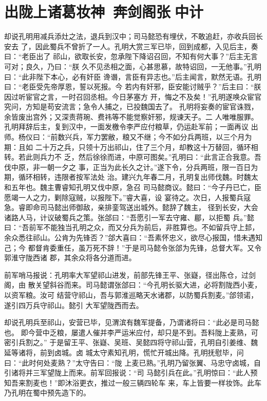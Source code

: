 \chapter{出陇上诸葛妆神~奔剑阁张中计}

却说孔明用减兵添灶之法，退兵到汉中；司马懿恐有埋伏，不敢追赶，亦收兵回长安去
了，因此蜀兵不曾折了一人。孔明大赏三军已毕，回到成都，入见后主，奏曰：“老臣出了
祁山，欲取长安，忽承陛下降诏召回，不知有何大事？”后主无言可对；良久，乃曰：“朕
久不见丞相之面，心甚思慕，故特诏回，一无他事。”孔明曰：“此非陛下本心，必有奸臣
谗谮，言臣有异志也。”后主闻言，默然无语。孔明曰：“老臣受先帝厚恩，誓以死报。今
若内有奸邪，臣安能讨贼乎？”后主曰：“朕因过听宦官之言，一时召回丞相。今日茅塞方
开，悔之不及矣！”孔明遂唤众宦官究问，方知是苟安流言；急令人捕之，已投魏国去了。
孔明将妄奏的宦官诛戮，余皆废出宫外；又深责蒋琬、费祎等不能觉察奸邪，规谏天子。二
人唯唯服罪。孔明拜辞后主，复到汉中，一面发檄令李严应付粮草，仍运赴军前；一面再议
出师。杨仪曰：“前数兴兵，军力罢敝，粮又不继；今不如分兵两班，以三个月为期：且如
二十万之兵，只领十万出祁山，住了三个月，却教这十万替回，循环相转。若此则兵力不
乏，然后徐徐而进，中原可图矣。”孔明曰：“此言正合我意。吾伐中原，非一朝一夕之
事，正当为此长久之计。”遂下令，分兵两班，限一百日为期，循环相转，违限者按军法处
治。建兴九年春二月，孔明复出师伐魏。时魏太和五年也。魏主曹睿知孔明又伐中原，急召
司马懿商议。懿曰：“今子丹已亡，臣愿竭一人之力，剿除寇贼，以报陛下。”睿大喜，设
宴待之。次日，人报蜀兵寇急。睿即命司马懿出师御敌，亲排銮驾送出城外。懿辞了魏主，
径到长安，大会诸路人马，计议破蜀兵之策。张郃曰：“吾愿引一军去守雍、郿，以拒蜀
兵。”懿曰：“吾前军不能独当孔明之众，而又分兵为前后，非胜算也。不如留兵守上邽，
余众悉往祁山。公肯为先锋否？”郃大喜曰：“吾素怀忠义，欲尽心报国，惜未遇知己；今
都督肯委重任，虽万死不辞！”于是司马懿令张郃为先锋，总督大军。又令郭淮守陇西诸
郡，其余众将各分道而进。

前军哨马报说：孔明率大军望祁山进发，前部先锋王平、张嶷，径出陈仓，过剑阁，由
散关望斜谷而来。司马懿谓张郃曰：“今孔明长驱大进，必将割陇西小麦，以资军粮。汝可
结营守祁山，吾与郭淮巡略天水诸郡，以防蜀兵割麦。”郃领诺，遂引四万兵守祁山。懿引
大军望陇西而去。

却说孔明兵至祁山，安营已毕，见渭滨有魏军提备，乃谓诸将曰：“此必是司马懿也。
即今营中乏粮，屡遣人催并李严运米应付，却只是不到。吾料陇上麦熟，可密引兵割之。”
于是留王平、张嶷、吴班、吴懿四将守祁山营，孔明自引姜维、魏延等诸将，前到卤城。卤
城太守素知孔明，慌忙开城出降。孔明抚慰毕，问曰：“此时何处麦熟？”太守告曰：“陇
上麦已熟。”孔明乃留张翼、马忠守卤城，自引诸将并三军望陇上而来。前军回报说：“司
马懿引兵在此。”孔明惊曰：“此人预知吾来割麦也！”即沐浴更衣，推过一般三辆四轮车
来，车上皆要一样妆饰。此车乃孔明在蜀中预先造下的。

